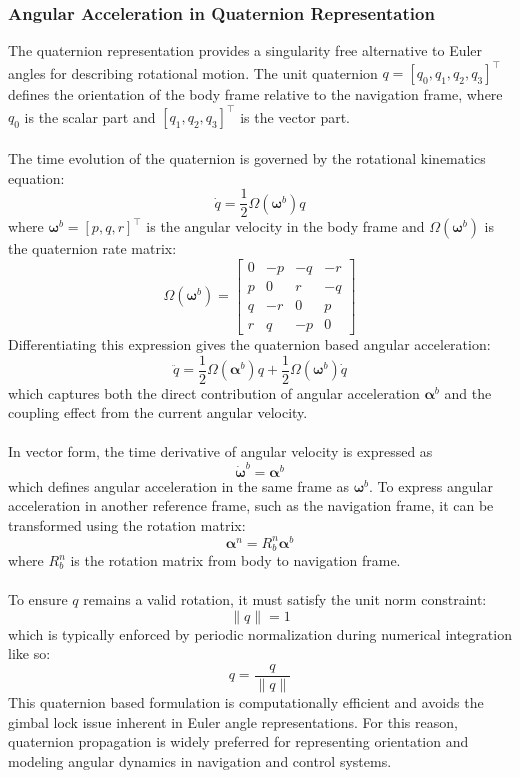 \subsubsection{Angular Acceleration in Quaternion Representation}
The quaternion representation provides a singularity free alternative to Euler angles for describing rotational motion. The unit quaternion $q = [q_0, q_1, q_2, q_3]^\top$ defines the orientation of the body frame relative to the navigation frame, where $q_0$ is the scalar part and $[q_1, q_2, q_3]^\top$ is the vector part.  
\\ \\
The time evolution of the quaternion is governed by the rotational kinematics equation:
$$
    \dot{q} = \frac{1}{2}\Omega(\boldsymbol{\omega}^b)q
$$
where $\boldsymbol{\omega}^b = [p, q, r]^\top$ is the angular velocity in the body frame and $\Omega(\boldsymbol{\omega}^b)$ is the quaternion rate matrix:
$$
    \Omega(\boldsymbol{\omega}^b) =
    \begin{bmatrix}
        0 & -p & -q & -r \\
        p &  0 &  r & -q \\
        q & -r &  0 &  p \\
        r &  q & -p &  0
    \end{bmatrix}
$$
Differentiating this expression gives the quaternion based angular acceleration:
$$
    \ddot{q} = \frac{1}{2}\Omega(\boldsymbol{\alpha}^b)q + \frac{1}{2}\Omega(\boldsymbol{\omega}^b)\dot{q}
$$
which captures both the direct contribution of angular acceleration $\boldsymbol{\alpha}^b$ and the coupling effect from the current angular velocity.  
\\ \\
In vector form, the time derivative of angular velocity is expressed as
$$
    \dot{\boldsymbol{\omega}}^b = \boldsymbol{\alpha}^b
$$
which defines angular acceleration in the same frame as $\boldsymbol{\omega}^b$. To express angular acceleration in another reference frame, such as the navigation frame, it can be transformed using the rotation matrix:
$$
    \boldsymbol{\alpha}^n = R_b^n \boldsymbol{\alpha}^b
$$
where $R_b^n$ is the rotation matrix from body to navigation frame.
\\ \\
To ensure $q$ remains a valid rotation, it must satisfy the unit norm constraint:
$$
    \|q\| = 1
$$
which is typically enforced by periodic normalization during numerical integration like so:
$$
    q = \frac{q}{\|q\|}
$$  
This quaternion based formulation is computationally efficient and avoids the gimbal lock issue inherent in Euler angle representations. For this reason, quaternion propagation is widely preferred for representing orientation and modeling angular dynamics in navigation and control systems.



